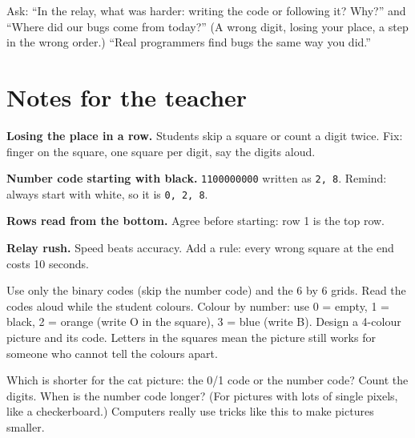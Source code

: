 \begin{reflection}
Ask: \enquote{In the relay, what was harder: writing the code or following it? Why?} and \enquote{Where did our bugs come from today?} (A wrong digit, losing your place, a step in the wrong order.) \enquote{Real programmers find bugs the same way you did.}
\end{reflection}

\section{Notes for the teacher}
\begin{commonmistakes}
  \item \textbf{Losing the place in a row.} Students skip a square or count a digit twice. Fix: finger on the square, one square per digit, say the digits aloud.
  \item \textbf{Number code starting with black.} \texttt{1100000000} written as \texttt{2, 8}. Remind: always start with white, so it is \texttt{0, 2, 8}.
  \item \textbf{Rows read from the bottom.} Agree before starting: row 1 is the top row.
  \item \textbf{Relay rush.} Speed beats accuracy. Add a rule: every wrong square at the end costs 10 seconds.
\end{commonmistakes}

\begin{differentiation}
\supportpath Use only the binary codes (skip the number code) and the 6 by 6 grids. Read the codes aloud while the student colours.
\extensionpath Colour by number: use 0 = empty, 1 = black, 2 = orange (write O in the square), 3 = blue (write B). Design a 4-colour picture and its code. Letters in the squares mean the picture still works for someone who cannot tell the colours apart.
\end{differentiation}

\begin{stretchchallenge}
Which is shorter for the cat picture: the 0/1 code or the number code? Count the digits. When is the number code longer? (For pictures with lots of single pixels, like a checkerboard.) Computers really use tricks like this to make pictures smaller.
\end{stretchchallenge}

